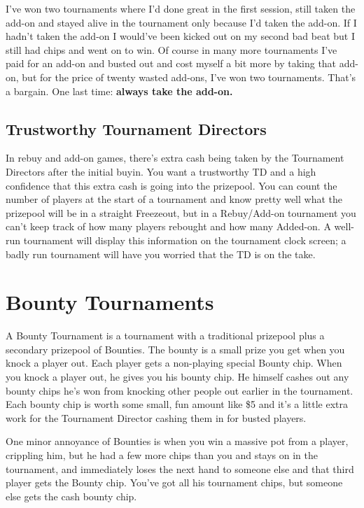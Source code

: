I've won two tournaments where I'd done great in the first session,
still taken the add-on and stayed alive in the tournament only because
I'd taken the add-on. If I hadn't taken the add-on I would've been
kicked out on my second bad beat but I still had chips
and went on to win. Of course in many more tournaments
I've paid for an add-on and busted out and cost myself a bit more by
taking that add-on, but for the price of twenty wasted add-ons, I've won two
tournaments. That's a bargain. One last time: \textbf{always take the add-on.}

\subsection{Trustworthy Tournament Directors}

In rebuy and add-on games, there's extra cash being taken by
the Tournament Directors after the initial buyin. You want
a trustworthy TD and a high confidence that this extra cash is
going into the prizepool. You can count the number of players
at the start of a tournament and know pretty well what the prizepool
will be in a straight Freezeout, but in a Rebuy/Add-on tournament
you can't keep track of how many players rebought and how
many Added-on. A well-run tournament will display this
information on the tournament clock screen; a badly run tournament
will have you worried that the TD is on the take.

\section{Bounty Tournaments}

A Bounty Tournament is a tournament with a traditional prizepool
plus a secondary prizepool of Bounties. The bounty
is a small prize you get when you knock a player out.
Each player gets a non-playing special Bounty chip.
When you knock a player out, he gives you his bounty chip.
He himself cashes out any bounty chips he's won from knocking
other people out earlier in the tournament. Each bounty chip is worth
some small, fun amount like \$5 and it's a little extra work for the
Tournament Director cashing them in for busted players.

One minor annoyance of Bounties is when you win a massive pot
from a player, crippling him, but he had a few more chips than
you and stays on in the tournament, and immediately loses the
next hand to someone else and that third player gets the
Bounty chip. You've got all his tournament chips, but someone
else gets the cash bounty chip.

